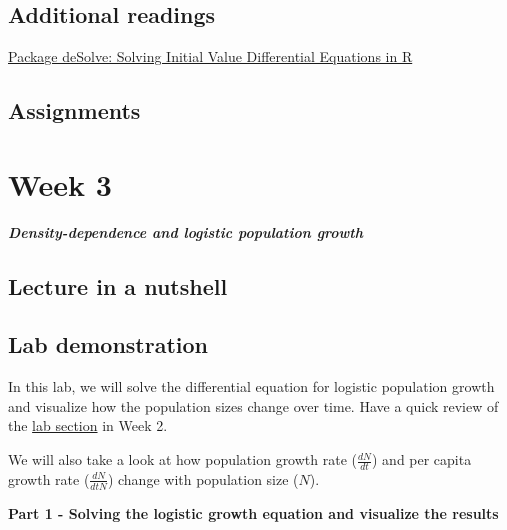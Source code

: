 \documentclass[
]{book}
\begin{document}
\hypertarget{additional-readings-1}{%
\section*{Additional readings}\label{additional-readings-1}}

\href{./Additional\%20readings/Package\%20deSolve\%20-\%20Solving\%20Initial\%20Value\%20Differential\%20Equations\%20in\%20R.pdf}{Package deSolve: Solving Initial Value Differential Equations in R}

\hypertarget{assignments-1}{%
\section*{Assignments}\label{assignments-1}}

\hypertarget{week-3}{%
\chapter*{Week 3}\label{week-3}}

\textbf{\emph{Density-dependence and logistic population growth}}

\hypertarget{lecture-in-a-nutshell-2}{%
\section*{Lecture in a nutshell}\label{lecture-in-a-nutshell-2}}

\hypertarget{lab-demonstration-2}{%
\section*{Lab demonstration}\label{lab-demonstration-2}}

In this lab, we will solve the differential equation for logistic population growth and visualize how the population sizes change over time. Have a quick review of the \href{https://genchanghsu.github.io/2021_Fall_Introduction_to_Theoretical_Ecology/week-2.html\#lab-demonstration-1}{lab section} in Week 2.

We will also take a look at how population growth rate (\(\frac{dN}{dt}\)) and per capita growth rate (\(\frac{dN}{dtN}\)) change with population size (\(N\)).

\textbf{Part 1 - Solving the logistic growth equation and visualize the results}
\end{document}
